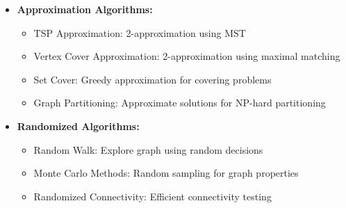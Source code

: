 \documentclass[a4paper,10pt]{book}
\begin{document}
\begin{itemize}[leftmargin=*]
    \item \textbf{Approximation Algorithms:}
    \begin{itemize}
        \item TSP Approximation: 2-approximation using MST
        \item Vertex Cover Approximation: 2-approximation using maximal matching
        \item Set Cover: Greedy approximation for covering problems
        \item Graph Partitioning: Approximate solutions for NP-hard partitioning
    \end{itemize}

    \item \textbf{Randomized Algorithms:}
    \begin{itemize}
        \item Random Walk: Explore graph using random decisions
        \item Monte Carlo Methods: Random sampling for graph properties
        \item Randomized Connectivity: Efficient connectivity testing
    \end{itemize}
\end{itemize}
\end{document}

